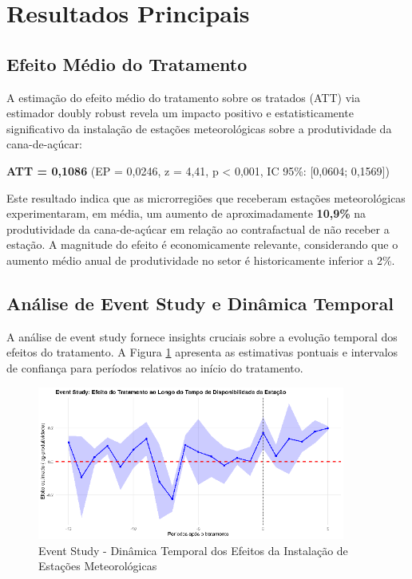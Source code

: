 \documentclass[
	12pt,				%
	openright,			%
	oneside,			%
	a4paper,			%
	english,			%
	french,				%
	spanish,			%
	brazil				%
	]{abntex2}
\begin{document}
\section{Resultados Principais}

\subsection{Efeito Médio do Tratamento}

A estimação do efeito médio do tratamento sobre os tratados (ATT) via estimador doubly robust revela um impacto positivo e estatisticamente significativo da instalação de estações meteorológicas sobre a produtividade da cana-de-açúcar:

\textbf{ATT = 0,1086} (EP = 0,0246, z = 4,41, p < 0,001, IC 95\%: [0,0604; 0,1569])

Este resultado indica que as microrregiões que receberam estações meteorológicas experimentaram, em média, um aumento de aproximadamente \textbf{10,9\%} na produtividade da cana-de-açúcar em relação ao contrafactual de não receber a estação. A magnitude do efeito é economicamente relevante, considerando que o aumento médio anual de produtividade no setor é historicamente inferior a 2\%.

\subsection{Análise de Event Study e Dinâmica Temporal}

A análise de event study fornece insights cruciais sobre a evolução temporal dos efeitos do tratamento. A Figura \ref{fig:eventstudy} apresenta as estimativas pontuais e intervalos de confiança para períodos relativos ao início do tratamento.

\begin{figure}[htbp]
\centering
\caption{Event Study - Dinâmica Temporal dos Efeitos da Instalação de Estações Meteorológicas}
\label{fig:eventstudy}
\includegraphics[width=0.9\textwidth]{event_study.png}
\end{figure}
\end{document}
